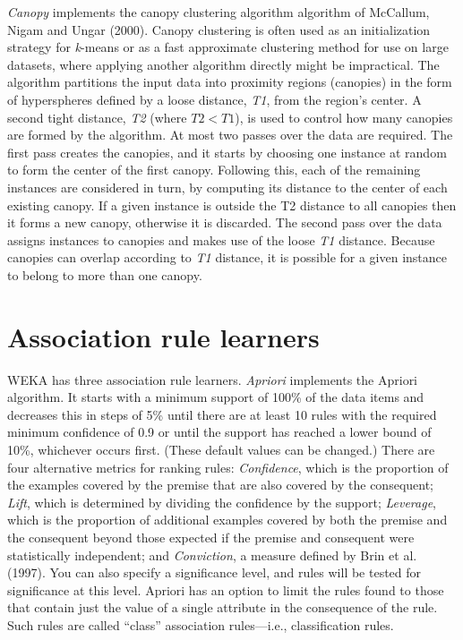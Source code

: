 \textit{Canopy} implements the canopy clustering algorithm algorithm
of McCallum, Nigam and Ungar (2000). Canopy clustering is often used
as an initialization strategy for \textit{k}-means or as a fast
approximate clustering method for use on large datasets, where
applying another algorithm directly might be impractical. The
algorithm partitions the input data into proximity regions (canopies)
in the form of hyperspheres defined by a loose distance, \textit{T1},
from the region's center. A second tight distance, \textit{T2} (where
$T2 < T1$), is used to control how many canopies are formed by the
algorithm. At most two passes over the data are required. The first
pass creates the canopies, and it starts by choosing one instance at
random to form the center of the first canopy. Following this, each of
the remaining instances are considered in turn, by computing its
distance to the center of each existing canopy. If a given instance is
outside the T2 distance to all canopies then it forms a new canopy,
otherwise it is discarded. The second pass over the data assigns
instances to canopies and makes use of the loose \textit{T1}
distance. Because canopies can overlap according to \textit{T1}
distance, it is possible for a given instance to belong to more than
one canopy.

\section{Association rule learners}

WEKA has three association rule learners. \textit{Apriori} implements
the Apriori algorithm. It starts with a minimum support of 100\% of
the data items and decreases this in steps of 5\% until there are at
least 10 rules with the required minimum confidence of 0.9 or until
the support has reached a lower bound of 10\%, whichever occurs
first. (These default values can be changed.) There are four
alternative metrics for ranking rules: \textit{Confidence}, which is
the proportion of the examples covered by the premise that are also
covered by the consequent; \textit{Lift}, which is determined by
dividing the confidence by the support; \textit{Leverage}, which is
the proportion of additional examples covered by both the premise and
the consequent beyond those expected if the premise and consequent
were statistically independent; and \textit{Conviction}, a measure defined by
Brin et al. (1997). You can also specify a significance level, and
rules will be tested for significance at this level. Apriori has an
option to limit the rules found to those that contain just the value
of a single attribute in the consequence of the rule. Such rules are
called ``class'' association rules---i.e., classification rules.

